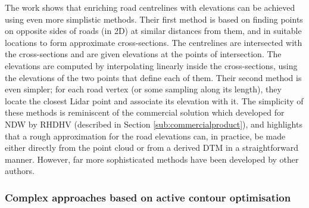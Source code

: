 The work \cite{cai_rasdorf_2008} shows that enriching road centrelines with elevations can be achieved using even more simplistic methods. Their first method is based on finding points on opposite sides of roads (in 2D) at similar distances from them, and in suitable locations to form approximate cross-sections. The centrelines are intersected with the cross-sections and are given elevations at the points of intersection. The elevations are computed by interpolating linearly inside the cross-sections, using the elevations of the two points that define each of them. Their second method is even simpler; for each road vertex  (or some sampling along its length), they locate the closest Lidar point and associate its elevation with it. The simplicity of these methods is reminiscent of the commercial solution which developed for NDW by RHDHV (described in Section \ref{sub:commercialproduct}), and highlights that a rough approximation for the road elevations can, in practice, be made either directly from the point cloud or from a derived DTM in a straightforward manner. However, far more sophisticated methods have been developed by other authors.

\subsubsection{Complex approaches based on active contour optimisation}

